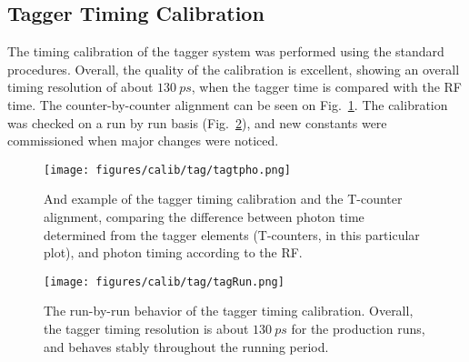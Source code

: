 \subsection{\label{sec:calib.tag}Tagger Timing Calibration}
The timing calibration of the tagger system was performed using the standard procedures. Overall, the quality of the calibration is excellent, showing an overall timing resolution of about $130~ps$, when the tagger time is compared with the RF time. The counter-by-counter alignment can be seen on Fig.~\ref{tagtpho}. The calibration was checked on a run by run basis (Fig.~\ref{tagRun}), and new constants were commissioned when major changes were noticed.  

\begin{figure}[h]
\begin{center}
 \texttt{[image: figures/calib/tag/tagtpho.png]}
  \caption{And example of the tagger timing calibration and the T-counter alignment, comparing  the difference between photon time determined from the tagger elements (T-counters, in this particular plot), and photon timing according to the RF. }
  \label{tagtpho}
  \end{center}
\end{figure}


\begin{figure}[h]
\begin{center}
 \texttt{[image: figures/calib/tag/tagRun.png]}
  \caption{The run-by-run behavior of the tagger timing calibration. Overall, the tagger timing resolution is about $130~ps$ for the production runs, and behaves stably throughout the running period.}
  \label{tagRun}
  \end{center}
\end{figure}
